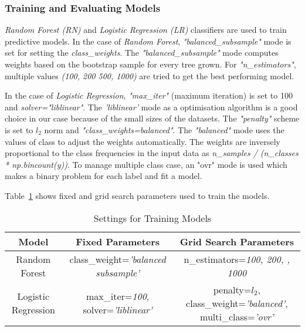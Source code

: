 \documentclass[english]{tktltiki2}
\theoremstyle{definition}
\theoremstyle{remark}
\begin{document}
\subsubsection{Training and Evaluating Models}
\textit{Random Forest (RN)} and \textit{Logistic Regression (LR)} classifiers are used to train predictive models. In the case of \textit{Random Forest}, \textit{"balanced\_subsample"} mode is set for setting the \textit{class\_weights}. The \textit{"balanced\_subsample"} mode computes weights based on the bootstrap sample for every tree grown. For \textit{"n\_estimators"}, multiple values \textit{(100, 200 500, 1000)} are tried to get the best performing model.

In the case of \textit{Logistic Regression}, \textit{"max\_iter"} (maximum iteration) is set to 100 and \textit{solver="liblinear"}. The \textit{'liblinear'} mode as a optimisation algorithm is a good choice in our case because of the small sizes of the datasets. The \textit{"penalty"} scheme is set to $l_2$ norm and \textit{"class\_weights=balanced"}. The \textit{"balanced"} mode uses the values of class to adjust the weights automatically. The weights are inversely proportional to the class frequencies in the input data as  \textit{n\_samples / (n\_classes * np.bincount(y))}. To manage multiple class case, an "ovr" mode is used which makes a binary problem for each label and fit a model. 

Table~\ref{table:training_models_datasets_UCI} shows fixed and grid search parameters used to train the models.


\begin{table}[H]
	\caption{Settings for Training Models}
	\label{table:training_models_datasets_UCI}
	\begin{center}
		\begin{tabular}{@{}ccc@{}}
			\toprule
			Model & Fixed Parameters & Grid Search Parameters \\ \hline

			\multicolumn{1}{|c|}{Random Forest} & \multicolumn{1}{p{40mm}|}{class\_weight=\textit{'balanced \newline subsample'}} & \multicolumn{1}{p{40mm}|}{n\_estimators=\textit{100, 200, \newline 500, 1000}} \\ \hline

			\multicolumn{1}{|c|}{Logistic Regression} & \multicolumn{1}{p{40mm}|}{max\_iter=\textit{100}, \newline solver=\textit{'liblinear'}} & \multicolumn{1}{p{40mm}|}{penalty=\textit{$l_2$},
			\newline class\_weight=\textit{'balanced'},
			\newline multi\_class=\textit{'ovr'}} \\ \hline
			

		\end{tabular}
	\end{center}
\end{table}
\end{document}
